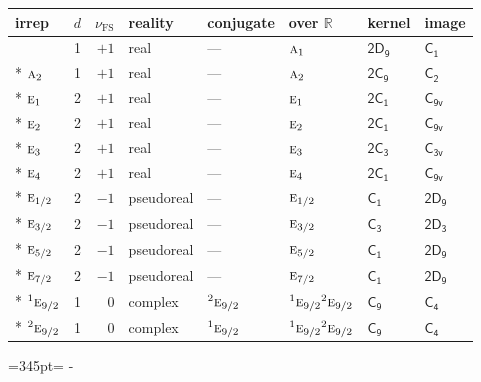 \documentclass[10pt,a4paper]{article}
\makeatletter
\def\grouprule#1#2{\noalign{\marks\LTgroupmarks{\the\belowrulesep}\nobreak\vskip#1%
  \vskip\aboverulesep}\multispan\LT@cols\unskip{\leaders\hrule\@height#2\hfill\kern\z@}\cr
  \noalign{\penalty\LTrulebreak\vskip\belowrulesep\global\@lastruleclass\z@}}
\newcommand{\needspace}[1]{\par\penalty-100\begingroup\dimen0=#1\relax\dimen2=\pagegoal
  \advance\dimen2-\pagetotal\ifdim\dimen0>\dimen2\relax\ifdim\dimen2>0pt\vfil\break\fi\fi
  \endgroup}
\numberwithin{equation}{section}
\newcommand{\grp}[1]{\mathsf{#1}}
\newcommand{\irr}[1]{\text{\normalfont\scshape #1}}
\newcommand{\conjpair}[1]{{}^{#1}}
\newcommand{\detbox}[1]{{\setlength{\fboxsep}{1pt}\fbox{#1}}}
\newcommand{\fsind}{\nu_{\mathrm{FS}}}
\makeatother
\begin{document}
{\small\renewcommand{\arraystretch}{1.25}\setlength{\tabcolsep}{4pt}\begin{longtable}{@{}lrrlllll@{}}\toprule
irrep & $d$ & $\fsind$ & reality & conjugate & over $\mathbb{R}$ & kernel & image\\\midrule\endhead
\bottomrule\endfoot\endlastfoot
\detbox{$\irr{a}_{1}$} & 1 & $+1$ & real & --- & $\irr{a}_{1}$ & \href{2D9.pdf}{$\grp{2D_{9}}$} & \href{../../../rotation/data/pdf/C1.pdf}{$\grp{C_{1}}$}\\*
$\irr{a}_{2}$ & 1 & $+1$ & real & --- & $\irr{a}_{2}$ & \href{2C9.pdf}{$\grp{2C_{9}}$} & \href{../../../rotation/data/pdf/C2.pdf}{$\grp{C_{2}}$}\\*
$\irr{e}_{1}$ & 2 & $+1$ & real & --- & $\irr{e}_{1}$ & \href{2C1.pdf}{$\grp{2C_{1}}$} & \href{../../../rotation/data/pdf/C9v.pdf}{$\grp{C_{9v}}$}\\*
$\irr{e}_{2}$ & 2 & $+1$ & real & --- & $\irr{e}_{2}$ & \href{2C1.pdf}{$\grp{2C_{1}}$} & \href{../../../rotation/data/pdf/C9v.pdf}{$\grp{C_{9v}}$}\\*
$\irr{e}_{3}$ & 2 & $+1$ & real & --- & $\irr{e}_{3}$ & \href{2C3.pdf}{$\grp{2C_{3}}$} & \href{../../../rotation/data/pdf/C3v.pdf}{$\grp{C_{3v}}$}\\*
$\irr{e}_{4}$ & 2 & $+1$ & real & --- & $\irr{e}_{4}$ & \href{2C1.pdf}{$\grp{2C_{1}}$} & \href{../../../rotation/data/pdf/C9v.pdf}{$\grp{C_{9v}}$}\\*
\grouprule{0pt}{\lightrulewidth}
$\irr{e}_{1/2}$ & 2 & $-1$ & pseudoreal & --- & $\irr{e}_{1/2}$ & \href{C1.pdf}{$\grp{C_{1}}$} & \href{2D9.pdf}{$\grp{2D_{9}}$}\\*
$\irr{e}_{3/2}$ & 2 & $-1$ & pseudoreal & --- & $\irr{e}_{3/2}$ & \href{C3.pdf}{$\grp{C_{3}}$} & \href{2D3.pdf}{$\grp{2D_{3}}$}\\*
$\irr{e}_{5/2}$ & 2 & $-1$ & pseudoreal & --- & $\irr{e}_{5/2}$ & \href{C1.pdf}{$\grp{C_{1}}$} & \href{2D9.pdf}{$\grp{2D_{9}}$}\\*
$\irr{e}_{7/2}$ & 2 & $-1$ & pseudoreal & --- & $\irr{e}_{7/2}$ & \href{C1.pdf}{$\grp{C_{1}}$} & \href{2D9.pdf}{$\grp{2D_{9}}$}\\*
$\conjpair{1}\irr{e}_{9/2}$ & 1 & $0$ & complex & $\conjpair{2}\irr{e}_{9/2}$ & $\conjpair{1}\irr{e}_{9/2}\conjpair{2}\irr{e}_{9/2}$ & \href{C9.pdf}{$\grp{C_{9}}$} & \href{../../../rotation/data/pdf/C4.pdf}{$\grp{C_{4}}$}\\*
$\conjpair{2}\irr{e}_{9/2}$ & 1 & $0$ & complex & $\conjpair{1}\irr{e}_{9/2}$ & $\conjpair{1}\irr{e}_{9/2}\conjpair{2}\irr{e}_{9/2}$ & \href{C9.pdf}{$\grp{C_{9}}$} & \href{../../../rotation/data/pdf/C4.pdf}{$\grp{C_{4}}$}\\
\bottomrule\end{longtable}}
\needspace{345pt}
\end{document}

